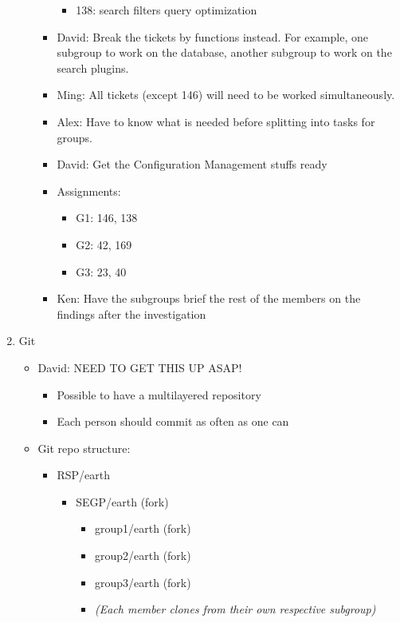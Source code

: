 \documentclass{letter}
\begin{document}
\begin{enumerate}
\begin{itemize}
\begin{itemize}
\begin{itemize}
							\item 138: search filters query optimization
						\end{itemize}
					\item David: Break the tickets by functions instead. For example, one subgroup to work on the database, another subgroup to work on the search plugins. 
					\item Ming: All tickets (except 146) will need to be worked simultaneously.
					\item Alex: Have to know what is needed before splitting into tasks for groups.
					\item David: Get the Configuration Management stuffs ready
					\item Assignments:
						\begin{itemize}
							\item G1: 146, 138
							\item G2: 42, 169
							\item G3: 23, 40
						\end{itemize}
					\item Ken: Have the subgroups brief the rest of the members on the findings after the investigation
				\end{itemize}
		\end{itemize}
	\item Git
		\begin{itemize}
			\item David: NEED TO GET THIS UP ASAP!
				\begin{itemize}
					\item Possible to have a multilayered repository
					\item Each person should commit as often as one can
				\end{itemize}
			\item Git repo structure: 
				\begin{itemize}
					\item RSP/earth 
						\begin{itemize}
							\item SEGP/earth (fork)
								\begin{itemize}
									\item group1/earth (fork)
									\item group2/earth (fork)
									\item group3/earth (fork)
									\item \textsl{(Each member clones from their own respective subgroup)}
								\end{itemize}

\end{itemize}
\end{itemize}
\end{itemize}
\end{enumerate}
\end{document}
